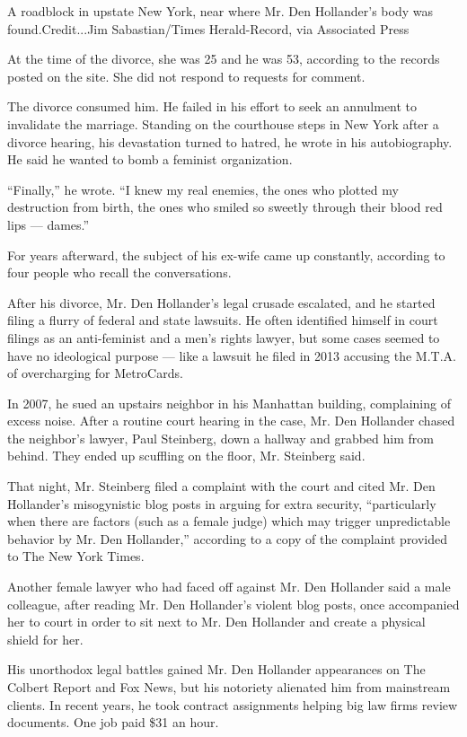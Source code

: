A roadblock in upstate New York, near where Mr. Den Hollander's body was
found.Credit...Jim Sabastian/Times Herald-Record, via Associated Press

At the time of the divorce, she was 25 and he was 53, according to the
records posted on the site. She did not respond to requests for comment.

The divorce consumed him. He failed in his effort to seek an annulment
to invalidate the marriage. Standing on the courthouse steps in New York
after a divorce hearing, his devastation turned to hatred, he wrote in
his autobiography. He said he wanted to bomb a feminist organization.

``Finally,'' he wrote. ``I knew my real enemies, the ones who plotted my
destruction from birth, the ones who smiled so sweetly through their
blood red lips --- dames.''

For years afterward, the subject of his ex-wife came up constantly,
according to four people who recall the conversations.

After his divorce, Mr. Den Hollander's legal crusade escalated, and he
started filing a flurry of federal and state lawsuits. He often
identified himself in court filings as an anti-feminist and a men's
rights lawyer, but some cases seemed to have no ideological purpose ---
like a lawsuit he filed in 2013 accusing the M.T.A. of overcharging for
MetroCards.

In 2007, he sued an upstairs neighbor in his Manhattan building,
complaining of excess noise. After a routine court hearing in the case,
Mr. Den Hollander chased the neighbor's lawyer, Paul Steinberg, down a
hallway and grabbed him from behind. They ended up scuffling on the
floor, Mr. Steinberg said.

That night, Mr. Steinberg filed a complaint with the court and cited Mr.
Den Hollander's misogynistic blog posts in arguing for extra security,
``particularly when there are factors (such as a female judge) which may
trigger unpredictable behavior by Mr. Den Hollander,'' according to a
copy of the complaint provided to The New York Times.

Another female lawyer who had faced off against Mr. Den Hollander said a
male colleague, after reading Mr. Den Hollander's violent blog posts,
once accompanied her to court in order to sit next to Mr. Den Hollander
and create a physical shield for her.

His unorthodox legal battles gained Mr. Den Hollander appearances on The
Colbert Report and Fox News, but his notoriety alienated him from
mainstream clients. In recent years, he took contract assignments
helping big law firms review documents. One job paid \$31 an hour.

